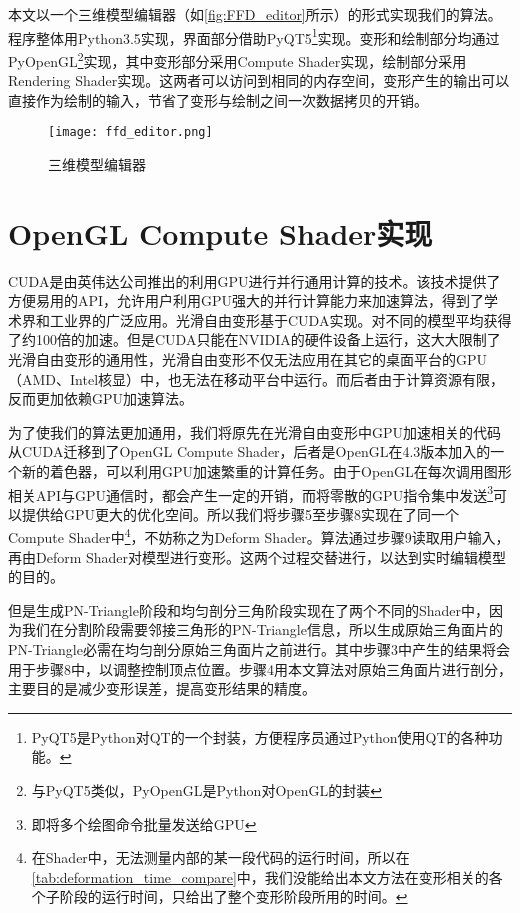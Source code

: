 本文以一个三维模型编辑器（如\autoref{fig:FFD_editor}所示）的形式实现我们的算法。程序整体用Python3.5实现，界面部分借助PyQT5\footnote{PyQT5是Python对QT的一个封装，方便程序员通过Python使用QT的各种功能。}实现。变形和绘制部分均通过PyOpenGL\footnote{与PyQT5类似，PyOpenGL是Python对OpenGL的封装}实现，其中变形部分采用Compute Shader实现，绘制部分采用Rendering Shader实现。这两者可以访问到相同的内存空间，变形产生的输出可以直接作为绘制的输入，节省了变形与绘制之间一次数据拷贝的开销。


\begin{figure}[htbp]
	\centering
	\texttt{[image: ffd\_editor.png]}
	\caption{三维模型编辑器}\label{fig:FFD_editor}
\end{figure}


\section{OpenGL Compute Shader实现}
CUDA是由英伟达公司推出的利用GPU进行并行通用计算的技术。该技术提供了方便易用的API，允许用户利用GPU强大的并行计算能力来加速算法，得到了学术界和工业界的广泛应用。光滑自由变形\cite{Cui15}基于CUDA实现。对不同的模型平均获得了约100倍的加速。但是CUDA只能在NVIDIA的硬件设备上运行，这大大限制了光滑自由变形的通用性，光滑自由变形不仅无法应用在其它的桌面平台的GPU（AMD、Intel核显）中，也无法在移动平台中运行。而后者由于计算资源有限，反而更加依赖GPU加速算法。

为了使我们的算法更加通用，我们将原先在光滑自由变形中GPU加速相关的代码从CUDA迁移到了OpenGL Compute Shader，后者是OpenGL在4.3版本加入的一个新的着色器，可以利用GPU加速繁重的计算任务。由于OpenGL在每次调用图形相关API与GPU通信时，都会产生一定的开销，而将零散的GPU指令集中发送\footnote{即将多个绘图命令批量发送给GPU}可以提供给GPU更大的优化空间。所以我们将步骤5至步骤8实现在了同一个Compute Shader中\footnote{在Shader中，无法测量内部的某一段代码的运行时间，所以在\autoref{tab:deformation_time_compare}中，我们没能给出本文方法在变形相关的各个子阶段的运行时间，只给出了整个变形阶段所用的时间。}，不妨称之为Deform Shader。算法通过步骤9读取用户输入，再由Deform Shader对模型进行变形。这两个过程交替进行，以达到实时编辑模型的目的。

但是生成PN-Triangle阶段和均匀剖分三角阶段实现在了两个不同的Shader中，因为我们在分割阶段需要邻接三角形的PN-Triangle信息，所以生成原始三角面片的PN-Triangle必需在均匀剖分原始三角面片之前进行。其中步骤3中产生的结果将会用于步骤8中，以调整控制顶点位置。步骤4用本文算法对原始三角面片进行剖分，主要目的是减少变形误差，提高变形结果的精度。


